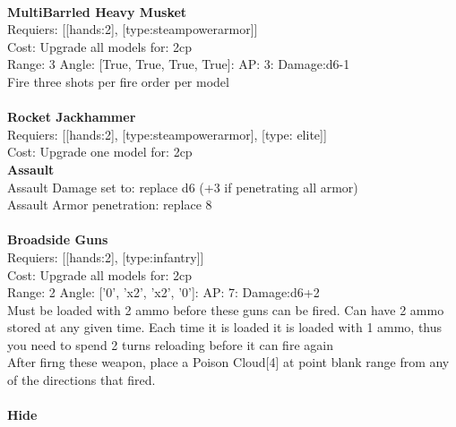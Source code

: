 \ \\
{\bf MultiBarrled Heavy Musket } \\

Requiers: [[hands:2], [type:steampowerarmor]] \\
Cost: Upgrade all models for: 2cp \\


Range: 3  Angle: [True, True, True, True]: AP: 3: Damage:d6-1 \\
Fire three shots per fire order per model\\ 








\ \\
{\bf Rocket Jackhammer } \\

Requiers: [[hands:2], [type:steampowerarmor], [type: elite]] \\
Cost: Upgrade one model for: 2cp \\




{\bf Assault} \ \\
Assault Damage set to: replace d6 (+3 if penetrating all armor)
\\ 
Assault Armor penetration: replace 8 
\\ 




\ \\
{\bf Broadside Guns } \\

Requiers: [[hands:2], [type:infantry]] \\
Cost: Upgrade all models for: 2cp \\


Range: 2  Angle: ['0', 'x2', 'x2', '0']: AP: 7: Damage:d6+2 \\
Must be loaded with 2 ammo before these guns can be fired. Can have 2 ammo stored at any given time. Each time it is loaded it is loaded with 1 ammo, thus you need to spend 2 turns reloading before it can fire again\\ 
After firng these weapon, place a Poison Cloud[4] at point blank range from any of the directions that fired.\\ 








\ \\
{\bf Hide } \\

